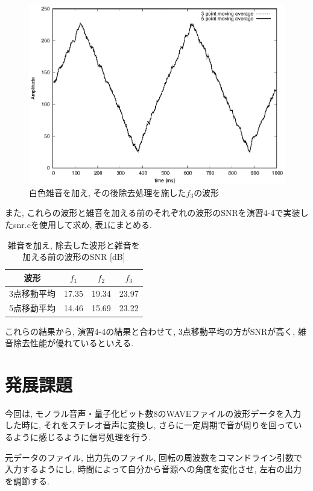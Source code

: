 \documentclass[titlepage]{jsarticle}
\begin{document}
    \begin{figure}[h]
        \centering
        \includegraphics[width=0.8\hsize]{images/f3mv.eps}
        \caption{白色雑音を加え, その後除去処理を施した$f_3$の波形}
        \label{fig:f3mv}
    \end{figure}

    また, これらの波形と雑音を加える前のそれぞれの波形のSNRを演習4-4で実装したsnr.cを使用して求め,
    表\ref{tab:fsnr}にまとめる.

    \begin{table}[h]
        \centering
        \caption{雑音を加え, 除去した波形と雑音を加える前の波形のSNR [dB]}
        \label{tab:fsnr}
        \begin{tabular}{c|ccc} \hline
            波形 & $f_1$ & $f_2$ & $f_3$ \\ \hline \hline
            3点移動平均 & 17.35 & 19.34 & 23.97 \\
            5点移動平均 & 14.46 & 15.69 & 23.22 \\ \hline
        \end{tabular}
    \end{table}

    これらの結果から, 演習4-4の結果と合わせて, 3点移動平均の方がSNRが高く, 雑音除去性能が優れているといえる.

\section{発展課題}
    今回は, モノラル音声・量子化ビット数8のWAVEファイルの波形データを入力した時に,
    それをステレオ音声に変換し, さらに一定周期で音が周りを回っているように感じるように信号処理を行う.

    元データのファイル, 出力先のファイル, 回転の周波数をコマンドライン引数で入力するようにし,
    時間によって自分から音源への角度を変化させ, 左右の出力を調節する.
\end{document}
